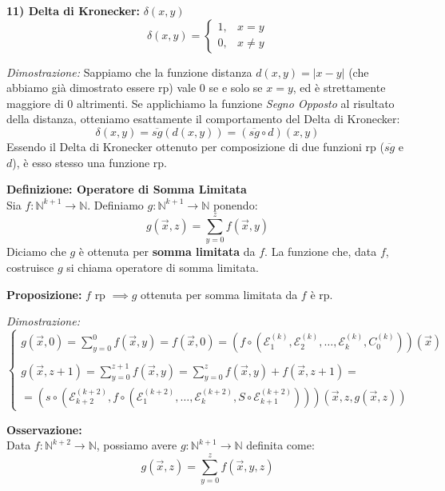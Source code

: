 \vspace{0.4cm}
\textbf{11) Delta di Kronecker:} $\delta(x,y)$
$$
\delta(x,y) = \begin{cases} 
1, & x = y \\ 
0, & x \neq y 
\end{cases}
$$

\textit{Dimostrazione:}
Sappiamo che la funzione distanza $d(x,y) = |x-y|$ (che abbiamo già dimostrato essere rp) vale $0$ se e solo se $x = y$, ed è strettamente maggiore di $0$ altrimenti.
Se applichiamo la funzione \textit{Segno Opposto} al risultato della distanza, otteniamo esattamente il comportamento del Delta di Kronecker:
$$ \delta(x,y) = \overline{sg}(d(x,y)) = \left( \overline{sg} \circ d \right)(x,y) $$
Essendo il Delta di Kronecker ottenuto per composizione di due funzioni rp ($\overline{sg}$ e $d$), è esso stesso una funzione rp.

\vspace{0.6cm}
\textbf{Definizione: Operatore di Somma Limitata} \\
Sia $f : \mathbb{N}^{k+1} \to \mathbb{N}$. Definiamo $g : \mathbb{N}^{k+1} \to \mathbb{N}$ ponendo:
$$ g(\vec{x}, z) = \sum_{y=0}^{z} f(\vec{x}, y) $$
Diciamo che $g$ è ottenuta per \textbf{somma limitata} da $f$. La funzione che, data $f$, costruisce $g$ si chiama operatore di somma limitata.

\vspace{0.4cm}
\textbf{Proposizione:} $f$ rp $\implies g$ ottenuta per somma limitata da $f$ è rp.

\textit{Dimostrazione:}
$$
\begin{cases} 
g(\vec{x}, 0) = \sum_{y=0}^{0} f(\vec{x}, y) = f(\vec{x}, 0) = \left( f \circ (\mathcal{E}_1^{(k)}, \mathcal{E}_2^{(k)}, \dots, \mathcal{E}_k^{(k)}, C_0^{(k)}) \right)(\vec{x}) \\ 
\\
g(\vec{x}, z+1) = \sum_{y=0}^{z+1} f(\vec{x}, y) = \sum_{y=0}^{z} f(\vec{x}, y) + f(\vec{x}, z+1) = \\
= \left( s \circ (\mathcal{E}_{k+2}^{(k+2)}, f \circ (\mathcal{E}_1^{(k+2)}, \dots, \mathcal{E}_k^{(k+2)}, S \circ \mathcal{E}_{k+1}^{(k+2)})) \right)(\vec{x}, z, g(\vec{x}, z)) 
\end{cases}
$$

\vspace{0.4cm}
\textbf{Osservazione:} \\
Data $f: \mathbb{N}^{k+2} \to \mathbb{N}$, possiamo avere $g: \mathbb{N}^{k+1} \to \mathbb{N}$ definita come:
$$ g(\vec{x}, z) = \sum_{y=0}^{z} f(\vec{x}, y, z) $$

